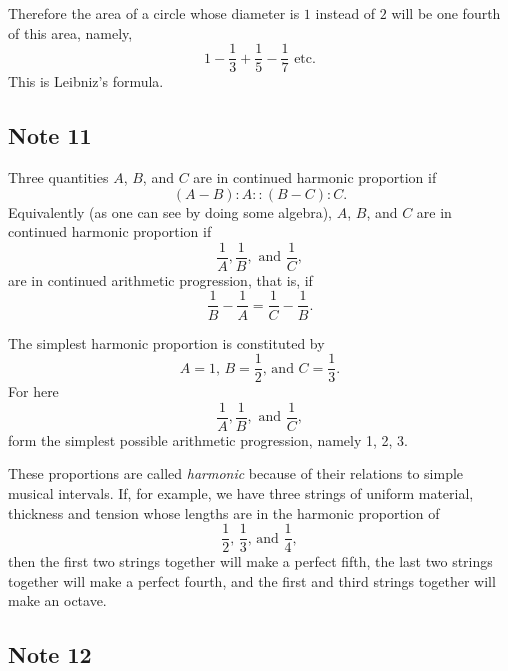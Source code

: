\documentclass[polutonikogreek,english,twoside,openright]{article}
\begin{document}
Therefore the area of a circle whose diameter is $1$ instead of $2$
will be one fourth of this area, namely,
$$1 -\frac{1}{3} + \frac{1}{5} - \frac{1}{7} \mbox{ etc.}$$
This is Leibniz's formula.

\subsection*{Note 11}
\label{ctp11}

Three quantities $A$, $B$, and $C$ are in continued harmonic proportion if 
$$(A-B) \!:\! A :: (B-C)\!:\!C.$$
Equivalently (as one can see by doing some algebra), $A$, $B$, and $C$
are in continued harmonic proportion if
$$\frac{1}{A}, \frac{1}{B}, \mbox{ and } \frac{1}{C},$$ 
are in continued arithmetic progression, that is, if
$$\frac{1}{B} -\frac{1}{A} = \frac{1}{C} - \frac{1}{B}.$$

The simplest harmonic proportion is constituted by 
$$A = 1\mbox{, }B= \frac{1}{2}\mbox{, and }C= \frac{1}{3}.$$
For here
$$\frac{1}{A}, \frac{1}{B}, \mbox{ and } \frac{1}{C},$$
form the simplest possible arithmetic progression, namely 1, 2, 3.

These proportions are called {\em harmonic} because of their relations
to simple musical intervals.  If, for example, we have three strings
of uniform material, thickness and tension whose lengths are in the
harmonic proportion of
$$\frac{1}{2}\mbox{, }\frac{1}{3} \mbox{, and }\frac{1}{4},$$
then the first two strings together will make a perfect fifth, the
last two strings together will make a perfect fourth, and the first
and third strings together will make an octave.

\subsection*{Note 12}
\label{ctp12}
\end{document}

